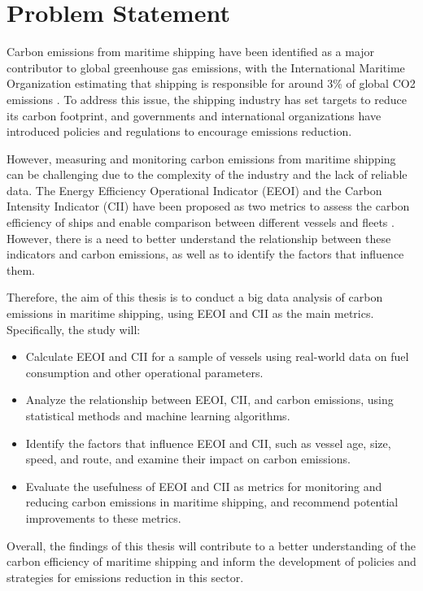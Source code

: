 \section{Problem Statement}

Carbon emissions from maritime shipping have been identified as a major contributor to global greenhouse gas emissions, with the International Maritime Organization estimating that shipping is responsible for around 3\% of global CO2 emissions \autocite{king_anthony_2022}.
To address this issue, the shipping industry has set targets to reduce its carbon footprint, and governments and international organizations have introduced policies and regulations to encourage emissions reduction.

However, measuring and monitoring carbon emissions from maritime shipping can be challenging due to the complexity of the industry and the lack of reliable data.
The Energy Efficiency Operational Indicator (EEOI) and the Carbon Intensity Indicator (CII) have been proposed as two metrics to assess the carbon efficiency of ships and enable comparison between different vessels and fleets \autocite{ZHANG2019118223,CHUAH2023115348}.
However, there is a need to better understand the relationship between these indicators and carbon emissions, as well as to identify the factors that influence them.

Therefore, the aim of this thesis is to conduct a big data analysis of carbon emissions in maritime shipping, using EEOI and CII as the main metrics. Specifically, the study will:

\begin{itemize}
    \item Calculate EEOI and CII for a sample of vessels using real-world data on fuel consumption and other operational parameters.
    \item Analyze the relationship between EEOI, CII, and carbon emissions, using statistical methods and machine learning algorithms.
    \item Identify the factors that influence EEOI and CII, such as vessel age, size, speed, and route, and examine their impact on carbon emissions.
    \item Evaluate the usefulness of EEOI and CII as metrics for monitoring and reducing carbon emissions in maritime shipping, and recommend potential improvements to these metrics.
\end{itemize}


Overall, the findings of this thesis will contribute to a better understanding of the carbon efficiency of maritime shipping and inform the development of policies and strategies for emissions reduction in this sector.